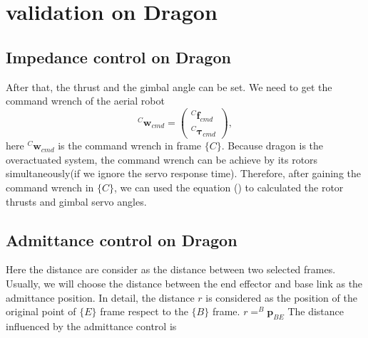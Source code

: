 \section{validation on Dragon}
\subsection{Impedance control on Dragon}
After that, the thrust and the gimbal angle can be set.
We need to get the command wrench of the aerial robot
\begin{equation}
\label{eq:command wrench dragon}
^C\mathbf{w}_{cmd}=\begin{pmatrix}
^C\!\boldsymbol{f}_{cmd} \\
^C\!\boldsymbol{\tau}_{cmd}
\end{pmatrix},
\end{equation}
here $^C\mathbf{w}_{cmd}$ is the command wrench in frame $\{C\}$.
Because dragon is the overactuated system, the command wrench can be achieve by its rotors simultaneously(if we ignore the servo response time). Therefore, after gaining the command wrench in $\{C\}$, we can used the equation () to calculated the rotor thrusts and gimbal servo angles.
\subsection{Admittance control on Dragon}
Here the distance are consider as the distance between two selected frames. Usually, we will choose the distance between the end effector and base link as the admittance position. In detail, the distance $r$ is considered as the position of the original point of $\{E\}$ frame respect to the $\{B\}$ frame. 
$r = ^B\boldsymbol{p}_{BE}$ 
The distance influenced by the admittance control is  

